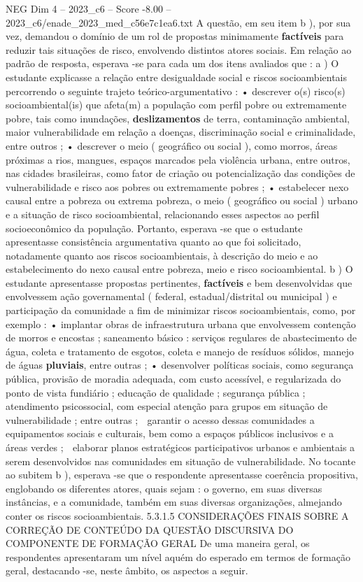 \begin{textsample}{NEG Dim 4 – 2023\_c6 – Score -8.00 – 2023\_c6/enade\_2023\_med\_c56e7c1ea6.txt}
A questão, em seu item b ), por sua vez, demandou o domínio de um rol de propostas minimamente \textbf{factíveis} para reduzir tais situações de risco, envolvendo distintos atores sociais.
Em relação ao padrão de resposta, esperava -se para cada um dos itens avaliados que : a ) O estudante explicasse a relação entre desigualdade social e riscos socioambientais percorrendo o seguinte trajeto teórico-argumentativo : • descrever o(s) risco(s) socioambiental(is) que afeta(m) a população com perfil pobre ou extremamente pobre, tais como inundações, \textbf{deslizamentos} de terra, contaminação ambiental, maior vulnerabilidade em relação a doenças, discriminação social e criminalidade, entre outros ; • descrever o meio ( geográfico ou social ), como morros, áreas próximas a rios, mangues, espaços marcados pela violência urbana, entre outros, nas cidades brasileiras, como fator de criação ou potencialização das condições de vulnerabilidade e risco aos pobres ou extremamente pobres ; • estabelecer nexo causal entre a pobreza ou extrema pobreza, o meio ( geográfico ou social ) urbano e a situação de risco socioambiental, relacionando esses aspectos ao perfil socioeconômico da população.
Portanto, esperava -se que o estudante apresentasse consistência argumentativa quanto ao que foi solicitado, notadamente quanto aos riscos socioambientais, à descrição do meio e ao estabelecimento do nexo causal entre pobreza, meio e risco socioambiental. b ) O estudante apresentasse propostas pertinentes, \textbf{factíveis} e bem desenvolvidas que envolvessem ação governamental ( federal, estadual/distrital ou municipal ) e participação da comunidade a fim de minimizar riscos socioambientais, como, por exemplo : • implantar obras de infraestrutura urbana que envolvessem contenção de morros e encostas ; saneamento básico : serviços regulares de abastecimento de água, coleta e tratamento de esgotos, coleta e manejo de resíduos sólidos, manejo de águas \textbf{pluviais}, entre outras ; • desenvolver políticas sociais, como segurança pública, provisão de moradia adequada, com custo acessível, e regularizada do ponto de vista fundiário ; educação de qualidade ; segurança pública ; atendimento psicossocial, com especial atenção para grupos em situação de vulnerabilidade ; entre outras ;  garantir o acesso dessas comunidades a equipamentos sociais e culturais, bem como a espaços públicos inclusivos e a áreas verdes ;  elaborar planos estratégicos participativos urbanos e ambientais a serem desenvolvidos nas comunidades em situação de vulnerabilidade.
No tocante ao subitem b ), esperava -se que o respondente apresentasse coerência propositiva, englobando os diferentes atores, quais sejam : o governo, em suas diversas instâncias, e a comunidade, também em suas diversas organizações, almejando conter os riscos socioambientais. 5.3.1.5 CONSIDERAÇÕES FINAIS SOBRE A CORREÇÃO DE CONTEÚDO DA QUESTÃO DISCURSIVA DO COMPONENTE DE FORMAÇÃO GERAL De uma maneira geral, os respondentes apresentaram um nível aquém do esperado em termos de formação geral, destacando -se, neste âmbito, os aspectos a seguir.

\end{textsample}
